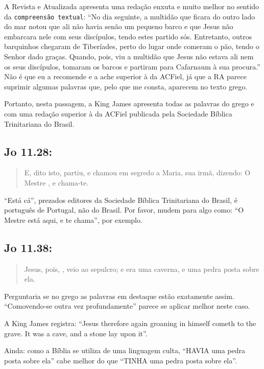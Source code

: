A Revista e Atualizada apresenta uma redação enxuta e muito melhor no
sentido da \texttt{compreensão textual}: ``No dia seguinte, a multidão que
ficara do outro lado do mar notou que ali não havia senão um pequeno
barco e que Jesus não embarcara nele com seus discípulos, tendo estes
partido sós. Entretanto, outros barquinhos chegaram de Tiberíades,
perto do lugar onde comeram o pão, tendo o Senhor dado graças. Quando,
pois, viu a multidão que Jesus não estava ali nem os seus discípulos,
tomaram os barcos e partiram para Cafarnaum à sua procura.'' Não é que
eu a recomende e a ache superior à da ACFiel, já que a RA parece
suprimir algumas palavras que, pelo que me consta, aparecem no texto
grego.

Portanto, nesta passagem, a King James apresenta todas as palavras do grego e com uma redação superior à da ACFiel publicada pela Sociedade Bíblica Trinitariana do Brasil.


\subsection*{Jo 11.28:}
\begin{quote}
    \small
E, dito isto, partiu, e chamou em segredo a Maria, sua irmã, dizendo: O Mestre , e chama-te.
\end{quote}

``Está cá'', prezados editores da Sociedade Bíblica Trinitariana do
Brasil, é português de Portugal, não do Brasil. Por favor, mudem para
algo como: ``O Mestre está aqui, e te chama'', por exemplo.

\subsection*{Jo 11.38:}
\begin{quote}
    \small
Jesus, pois, , veio ao sepulcro; e era uma caverna, e  uma pedra posta sobre ela.
\end{quote}

Perguntaria se no grego as palavras em destaque estão exatamente assim. ``Comovendo-se outra vez profundamente'' parece se aplicar melhor neste caso.

A  King James registra: ``Jesus therefore again groaning in himself cometh to the grave. It was a cave, and a stone lay upon it''.

Ainda: como a Bíblia se utiliza de uma linguagem culta, ``HAVIA uma pedra posta sobre ela'' cabe melhor do que ``TINHA uma pedra posta sobre ela''.

